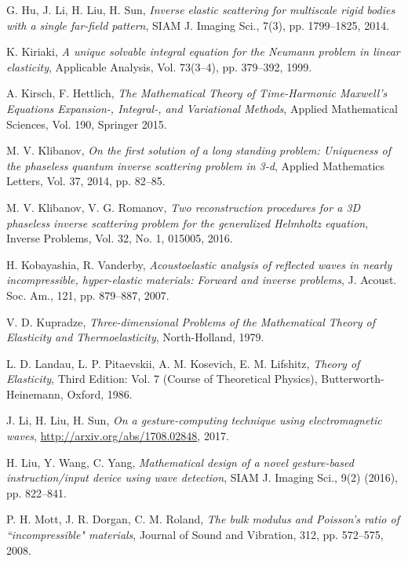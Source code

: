 \documentclass[a4paper,11pt]{article}
\theoremstyle{remark}
\theoremstyle{definition}
\numberwithin{equation}{section}
\begin{document}
\begin{thebibliography}{99}
 {G. Hu, J. Li, H. Liu, H. Sun}, {\it Inverse elastic scattering for multiscale rigid bodies with a single far-field
pattern}, SIAM J. Imaging Sci., 7(3), pp. 1799--1825, 2014.



 {K. Kiriaki}, {\it A unique solvable integral equation for the Neumann problem in linear elasticity}, Applicable Analysis, Vol. 73(3--4), pp. 379--392, 1999.

 { A. Kirsch, F. Hettlich}, {\it The Mathematical Theory of Time-Harmonic Maxwell's Equations
Expansion-, Integral-, and Variational Methods}, Applied Mathematical Sciences, Vol. 190, Springer 2015.


 {M. V. Klibanov}, {\it On the first solution of a long standing problem: Uniqueness of the phaseless quantum inverse scattering problem in 3-d}, Applied Mathematics Letters,
Vol. 37, 2014, pp. 82--85.

 {M. V. Klibanov, V. G. Romanov}, {\it Two reconstruction procedures for a 3D phaseless inverse scattering problem for the generalized Helmholtz equation},   Inverse Problems, Vol. 32, No. 1, 015005, 2016.


 {H. Kobayashia, R. Vanderby}, {\it Acoustoelastic analysis of reflected waves in nearly incompressible, hyper-elastic materials: Forward and inverse problems}, J. Acoust. Soc. Am., 121, pp. 879--887, 2007.

 {V. D. Kupradze}, {\it Three-dimensional Problems of the Mathematical Theory of Elasticity and Thermoelasticity}, North-Holland, 1979.


  {L. D. Landau, L. P. Pitaevskii, A. M. Kosevich, E. M. Lifshitz}, {\it Theory of Elasticity}, Third Edition: Vol. 7 (Course of Theoretical Physics), Butterworth-Heinemann, Oxford, 1986.

 {J. Li, H. Liu, H. Sun}, {\it On a gesture-computing technique using electromagnetic waves}, \url{http://arxiv.org/abs/1708.02848}, 2017.

 {H. Liu, Y. Wang, C. Yang}, {\it Mathematical design of a novel gesture-based instruction/input device using wave detection}, SIAM J. Imaging Sci., 9(2) (2016), pp. 822--841.

 {P. H. Mott, J. R. Dorgan, C. M. Roland}, {\it The bulk modulus and Poisson's ratio
of ``incompressible" materials}, Journal of Sound and Vibration, 312, pp. 572--575, 2008.


\end{thebibliography}
\end{document}
